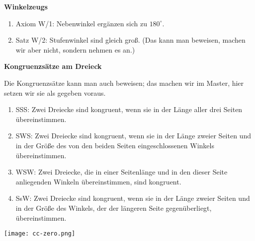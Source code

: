 \documentclass[12pt,a4paper,oneside,ngerman]{article}
\begin{document}
\newpage

\textbf{Winkelzeugs}
\begin{enumerate}
\item Axiom W/1: Nebenwinkel ergänzen sich zu $180^\circ$.
\item Satz W/2: Stufenwinkel sind gleich groß. (Das kann man beweisen, machen wir aber nicht, sondern nehmen es an.)
\end{enumerate}

\textbf{Kongruenzsätze am Dreieck}

Die Kongruenzsätze kann man auch beweisen; das machen wir im Master, hier setzen wir sie als gegeben voraus.
\begin{enumerate}
\item SSS: Zwei Dreiecke sind kongruent, wenn sie in der Länge aller drei Seiten übereinstimmen. 
\item SWS: Zwei Dreiecke sind kongruent, wenn sie in der Länge zweier Seiten und in der Größe des von den beiden Seiten eingeschlossenen Winkels übereinstimmen. 
\item WSW: Zwei Dreiecke, die in einer Seitenlänge und in den dieser Seite anliegenden Winkeln übereinstimmen, sind kongruent.
\item SsW: Zwei Dreiecke sind kongruent, wenn sie in der Länge zweier Seiten und in der Größe des Winkels, der der längeren Seite gegenüberliegt, übereinstimmen. 
\end{enumerate}


\vspace*{10mm}
\texttt{[image: cc-zero.png]}
\end{document}
